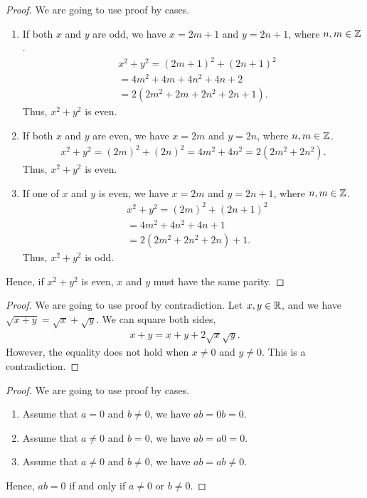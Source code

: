 \documentclass[8pt,twocolumn]{article}
\begin{document}
\begin{Answer}[number=2.2.11]
  \begin{proof}
    We are going to use proof by cases.
    \begin{enumerate}
      \item If both $x$ and $y$ are odd, we have $x=2m+1$ and $y=2n+1$, where
        $n,m\in\mathbb{Z}$.
        \begin{align*}
          &x^2 + y^2 = (2m+1)^2 + (2n+1)^2 \\
          &= 4m^2 + 4m + 4n^2 + 4n + 2\\
          &=2(2m^2+2m+2n^2+2n+1).
        \end{align*}
        Thus, $x^2+y^2$ is even.
      \item If both $x$ and $y$ are even, we have $x=2m$ and $y=2n$, where
        $n,m\in\mathbb{Z}$.
        \begin{align*}
          x^2 + y^2 = (2m)^2 + (2n)^2 = 4m^2 + 4n^2 = 2(2m^2+2n^2).
        \end{align*}
        Thus, $x^2+y^2$ is even.
      \item If one of $x$ and $y$ is even, we have $x=2m$ and $y=2n+1$, where
        $n,m\in\mathbb{Z}$.
        \begin{align*}
          &x^2 + y^2 = (2m)^2 + (2n+1)^2\\
          &= 4m^2 + 4n^2 + 4n + 1\\ &=
          2(2m^2+2n^2+2n) + 1.
        \end{align*}
        Thus, $x^2+y^2$ is odd.
    \end{enumerate}
    Hence, if $x^2+y^2$ is even, $x$ and $y$ must have the same parity.
  \end{proof}
\end{Answer}

\begin{Answer}[number=2.2.12]
  \begin{proof}
    We are going to use proof by contradiction. Let $x,y\in\mathbb{R}$, and we have
    $\sqrt{x+y}=\sqrt{x}+\sqrt{y}$. We can square both sides,
    \begin{align*}
      x+y = x + y + 2\sqrt{x}\sqrt{y}.
    \end{align*}
    However, the equality does not hold when $x\ne0$ and $y\ne0$.
    This is a contradiction.
  \end{proof}
\end{Answer}


\begin{Answer}[number=2.2.13]
  \begin{proof}
    We are going to use proof by cases.
    \begin{enumerate}
      \item Assume that $a=0$ and $b\ne0$, we have $ab = 0b = 0$.
      \item Assume that $a\ne0$ and $b=0$, we have $ab = a0 = 0$.
      \item Assume that $a\ne0$ and $b\ne0$, we have $ab = ab \ne 0$.
    \end{enumerate}
    Hence, $ab=0$ if and only if $a\ne0$ or $b\ne0$.
  \end{proof}
\end{Answer}
\end{document}
